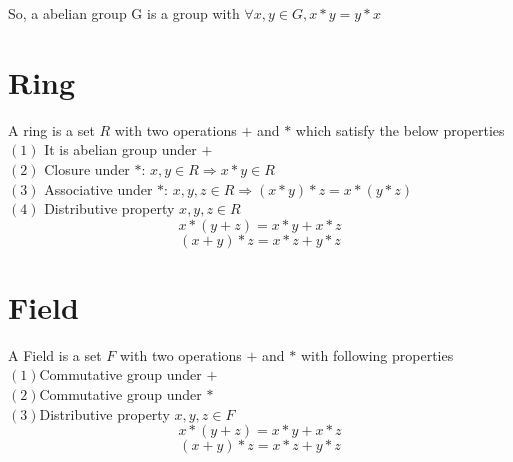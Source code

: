 \documentclass[12pt,a4paper]{report}
\begin{document}
	So, a abelian group G is a group with $\forall x,y \in G, x*y=y*x$
	\cleardoublepage
	
	\section{Ring}
	A ring is a set $R$ with two operations $+$ and $*$ which satisfy the below properties\\
	$(1)$ It is abelian group under $+$ \\
	$(2)$ Closure under $*$:  $x,y \in R \Rightarrow	x*y \in R $  \\
	$(3)$ Associative under $*$: $x,y,z \in R \Rightarrow	(x*y)*z=x*(y*z) $\\
	$(4)$ Distributive property $x,y,z \in R$
	$$x*(y+z)=x*y+x*z$$ $$(x+y)*z=x*z+y*z$$
	
	\section{Field}
	A Field is a set $F$ with two operations $+$ and $*$ with following properties \\
	$(1)$Commutative group under $+$\\
	$(2)$Commutative group under $*$\\
	$(3)$Distributive property $x,y,z \in F$
	$$x*(y+z)=x*y+x*z$$ $$(x+y)*z=x*z+y*z$$\\
	
\end{document}
